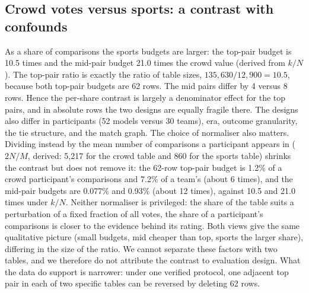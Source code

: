 \documentclass{article}
\begin{document}
\subsection{Crowd votes versus sports: a contrast with confounds}\label{sec:contrast}
As a share of comparisons the sports budgets are larger: the top-pair budget is 10.5 times and the mid-pair budget 21.0 times the crowd value (derived from $k/N$). %
The top-pair ratio is exactly the ratio of table sizes, $135{,}630/12{,}900=10.5$, because both top-pair budgets are 62 rows. The mid pairs differ by 4 versus 8 rows. Hence the per-share contrast is largely a denominator effect for the top pairs, and in absolute rows the two designs are equally fragile there. The designs also differ in participants (52 models versus 30 teams), era, outcome granularity, the tie structure, and the match graph. The choice of normaliser also matters. Dividing instead by the mean number of comparisons a participant appears in ($2N/M$, derived: 5,217 for the crowd table and 860 for the sports table) shrinks the contrast but does not remove it: the 62-row top-pair budget is 1.2\% of a crowd participant's comparisons and 7.2\% of a team's (about 6 times), and the mid-pair budgets are 0.077\% and 0.93\% (about 12 times), against 10.5 and 21.0 times under $k/N$. %
Neither normaliser is privileged: the share of the table suits a perturbation of a fixed fraction of all votes, the share of a participant's comparisons is closer to the evidence behind its rating. Both views give the same qualitative picture (small budgets, mid cheaper than top, sports the larger share), differing in the size of the ratio. We cannot separate these factors with two tables, and we therefore do not attribute the contrast to evaluation design. What the data do support is narrower: under one verified protocol, one adjacent top pair in each of two specific tables can be reversed by deleting 62 rows.
\end{document}

